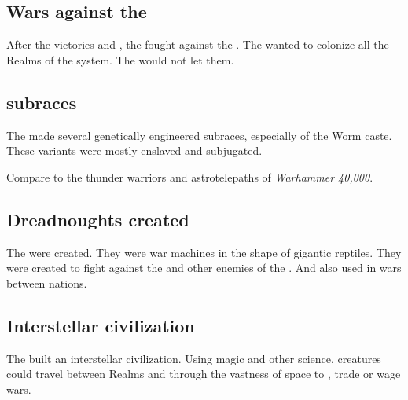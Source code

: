 \subsection{Wars against the \vorcanths}
After the victories  and , the \ophidians fought against the \vorcanths. 
The \ophidians wanted to colonize all the Realms of the system. 
The \vorcanths would not let them. 









\subsection{\Ophidian subraces}
The \caisith made several genetically engineered subraces, especially of the Worm caste.
These \caisith variants were mostly enslaved and subjugated. 

Compare to the thunder warriors and astrotelepaths of \emph{Warhammer 40,000}. 









\subsection{Dreadnoughts created}
The  were created. 
They were war machines in the shape of gigantic reptiles. 
They were created to fight against the \vorcanths and other enemies of the \ophidians.
And also used in wars between \ophidian nations. 









\subsection{Interstellar civilization}
The \ophidians built an interstellar civilization. 
Using magic and other science, creatures could travel between Realms and through the vastness of space to \cooperate, trade or wage wars. 

